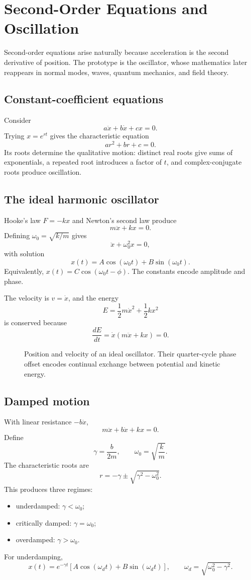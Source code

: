 \section{Second-Order Equations and Oscillation}
\label{sec:ch4-second-order}

Second-order equations arise naturally because acceleration is the second derivative of position. The prototype is the oscillator, whose mathematics later reappears in normal modes, waves, quantum mechanics, and field theory.

\subsection{Constant-coefficient equations}
Consider
\[
a\ddot x+b\dot x+cx=0.
\]
Trying $x=e^{rt}$ gives the characteristic equation
\[
ar^2+br+c=0.
\]
Its roots determine the qualitative motion: distinct real roots give sums of exponentials, a repeated root introduces a factor of $t$, and complex-conjugate roots produce oscillation.

\subsection{The ideal harmonic oscillator}
Hooke's law $F=-kx$ and Newton's second law produce
\[
m\ddot x+kx=0.
\]
Defining $\omega_0=\sqrt{k/m}$ gives
\[
\ddot x+\omega_0^2x=0,
\]
with solution
\[
\boxed{x(t)=A\cos(\omega_0t)+B\sin(\omega_0t)}.
\]
Equivalently, $x(t)=C\cos(\omega_0t-\phi)$. The constants encode amplitude and phase.

The velocity is $v=\dot x$, and the energy
\[
E=\frac12m\dot x^2+\frac12kx^2
\]
is conserved because
\[
\frac{dE}{dt}=\dot x(m\ddot x+kx)=0.
\]

\begin{figure}[htbp]
\centering

\caption{Position and velocity of an ideal oscillator. Their quarter-cycle phase offset encodes continual exchange between potential and kinetic energy.}
\label{fig:ch4-harmonic-motion}
\end{figure}

\subsection{Damped motion}
With linear resistance $-b\dot x$,
\[
m\ddot x+b\dot x+kx=0.
\]
Define
\[
\gamma=\frac{b}{2m},\qquad \omega_0=\sqrt{\frac{k}{m}}.
\]
The characteristic roots are
\[
r=-\gamma\pm\sqrt{\gamma^2-\omega_0^2}.
\]
This produces three regimes:
\begin{itemize}
\item underdamped: $\gamma<\omega_0$;
\item critically damped: $\gamma=\omega_0$;
\item overdamped: $\gamma>\omega_0$.
\end{itemize}
For underdamping,
\[
x(t)=e^{-\gamma t}\left[A\cos(\omega_dt)+B\sin(\omega_dt)\right],
\qquad \omega_d=\sqrt{\omega_0^2-\gamma^2}.
\]


